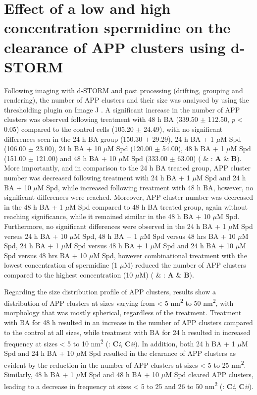 \section{Effect of a low and high concentration spermidine on the clearance of APP clusters using d-STORM}
Following imaging with d-STORM and post processing (drifting, grouping and rendering), the number of APP clusters and their size was analysed by using the thresholding plugin on Image J \citep{Schindelin2012}. A significant increase in the number of APP clusters was observed following treatment with 48 h BA (339.50 $\pm$ 112.50, \textit{p} < 0.05) compared to the control cells (105.20 $\pm$ 24.49), with no significant differences seen in the 24 h BA group (150.30 $\pm$ 29.29), 24 h BA + 1 $\mu$M Spd (106.00 $\pm$ 23.00), 24 h BA + 10 $\mu$M Spd (120.00 $\pm$ 54.00), 48 h BA + 1 $\mu$M Spd (151.00 $\pm$ 121.00) and 48 h BA + 10 $\mu$M Spd (333.00 $\pm$ 63.00) ( \& : \textbf{A} \& \textbf{B}). More importantly, and in comparison to the 24 h BA treated group, APP cluster number was decreased following treatment with 24 h BA + 1 $\mu$M Spd and 24 h BA + 10 $\mu$M Spd, while increased following treatment with 48 h BA, however, no significant differences were reached. Moreover, APP cluster number was decreased in the 48 h BA + 1 $\mu$M Spd compared to 48 h BA treated group, again without reaching significance, while it remained similar in the 48 h BA + 10 $\mu$M Spd. Furthermore, no significant differences were observed in the 24 h BA + 1 $\mu$M Spd versus 24 h BA + 10 $\mu$M Spd, 48 h BA + 1 $\mu$M Spd versus 48 hrs BA + 10 $\mu$M Spd, 24 h BA + 1 $\mu$M Spd versus 48 h BA + 1 $\mu$M Spd and 24 h BA + 10 $\mu$M Spd versus 48 hrs BA + 10 $\mu$M Spd, however combinational treatment with the lowest concentration of spermidine (1 $\mu$M) reduced the number of APP clusters compared to the highest concentration (10 $\mu$M) ( \& : \textbf{A} \& \textbf{B}).

Regarding the size distribution profile of APP clusters, results show a distribution of APP clusters at sizes varying from < 5 nm\textsuperscript{2} to 50 nm\textsuperscript{2}, with morphology that was mostly spherical, regardless of the treatment. Treatment with BA for 48 h resulted in an increase in the number of APP clusters compared to the control at all sizes, while treatment with BA for 24 h resulted in increased frequency at sizes < 5 to 10 nm\textsuperscript{2} (: \textbf{C}\textit{i}, \textbf{C}\textit{ii}). In addition, both 24 h BA + 1 $\mu$M Spd and 24 h BA + 10 $\mu$M Spd resulted in the clearance of APP clusters as evident by the reduction in the number of APP clusters at sizes < 5 to 25 nm\textsuperscript{2}. Similarly, 48 h BA + 1 $\mu$M Spd and 48 h BA + 10 $\mu$M Spd cleared APP clusters, leading to a decrease in frequency at sizes < 5 to 25 and 26 to 50 nm\textsuperscript{2} (: \textbf{C}\textit{i}, \textbf{C}\textit{ii}). 

